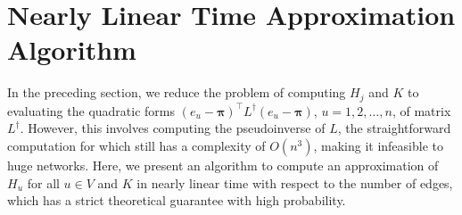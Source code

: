 \documentclass[sigconf]{acmart}
\newtheorem{definition}[theorem]{Definition}
\newcommand\ppi{\boldsymbol{\pi}}
\newcommand\ee{\boldsymbol{\mathit{e}}}
\newcommand\LL{\boldsymbol{\mathit{L}}}
\begin{document}
%
%
%
%

\section{Nearly Linear Time Approximation Algorithm}

In the preceding section, we reduce the problem of computing  $H_j$ and $K$ to evaluating the quadratic forms $(\ee_u - \ppi)^{\top} \LL^{\dagger} (\ee_u- \ppi)$, $u=1,2,\ldots, n$, of matrix  $\LL^{\dagger}$.  However,  this involves computing the pseudoinverse of $\LL$, the  straightforward computation for which still has a complexity of $O(n^3)$, making it infeasible to huge networks. Here, we present an algorithm to compute an approximation of $H_u$ for all  $u \in V$ and $K$  in nearly linear time with respect to the number of edges,  which has a strict theoretical guarantee with  high probability.
\end{document}
